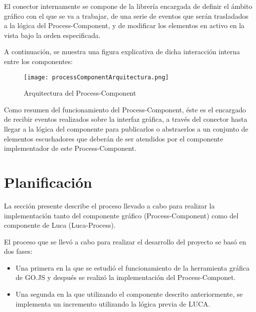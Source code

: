 \vspace{5mm}

El conector internamente se compone de la librería encargada de definir el ámbito gráfico con el que se va a trabajar, de una serie de eventos que serán trasladados a la lógica del Process-Component, y de modificar los elementos en activo en la vista bajo la orden especificada.

\vspace{5mm}

A continuación, se muestra una figura explicativa de dicha interacción interna entre los componentes:

\begin{figure}[H]
	\centering
	\texttt{[image: processComponentArquitectura.png]}
	\caption{Arquitectura del Process-Component}\label{fig:processComponent}
\end{figure}

Como resumen del funcionamiento del Process-Component, éste es el encargado de recibir eventos realizados sobre la interfaz gráfica, a través del conector hasta llegar a la lógica del componente para publicarlos o abstraerlos a un conjunto de elementos escuchadores que deberán de ser atendidos por el componente implementador de este Process-Component.


\section{Planificación}


	La sección presente describe el proceso llevado a cabo para realizar la implementación tanto del componente gráfico (Process-Component) como del componente de Luca (Luca-Process).

	\vspace{5mm}

	El proceso que se llevó a cabo para realizar el desarrollo del proyecto se basó en dos fases:
	
	\begin{itemize}
		\item  Una primera en la que se estudió el funcionamiento de la herramienta gráfica de GO.JS y después se realizó la implementación del Process-Componet.
		\item  Una segunda en la que utilizando el componente descrito anteriormente, se implementa un incremento utilizando la lógica previa de LUCA.

	\end{itemize}

